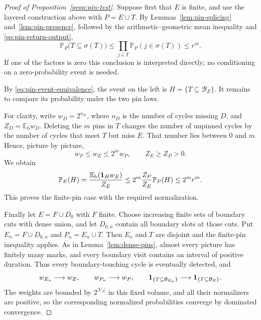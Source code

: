 \begin{proof}[Proof of Proposition~\ref{prop:pin-test}]
Suppose first that $E$ is finite, and use the layered construction
above with $P=E\cup T$.  By
Lemmas~\ref{lem:pin-splicing} and~\ref{lem:pin-presence}, followed
by the arithmetic--geometric mean inequality and
\eqref{eq:pin-return-output},
\begin{equation}\label{eq:pin-return-product}
 \mathbb P_P\bigl(T\subseteq\sigma(T)\bigr)
       \le\prod_{j\in T}\mathbb P_P(j\in\sigma(T))\le r^m.
\end{equation}
If one of the factors is zero this conclusion is interpreted directly;
no conditioning on a zero-probability event is needed.

By \eqref{eq:pin-event-equivalence}, the event on the left is
$H=\{T\subseteq\mathcal B_E\}$.  It remains to compare its probability
under the two pin laws.

For clarity, write $w_D=2^{n_D}$, where $n_D$ is the number of cycles
missing $D$, and $Z_D=\mathbb E_{\mathrm b}w_D$.
Deleting the $m$ pins in $T$ changes the number of unpinned cycles by
the number of cycles that meet $T$ but miss $E$.  That number lies
between $0$ and $m$.  Hence, picture by picture,
\[
                w_P\le w_E\le 2^m w_P,
                \qquad Z_E\ge Z_P>0.
\]
We obtain
\[
 \mathbb P_E(H)
  =\frac{\mathbb E_{\mathrm b}(\mathbf 1_Hw_E)}{Z_E}
  \le 2^m\frac{Z_P}{Z_E}\mathbb P_P(H)
  \le 2^m r^m.
\]
This proves the finite-pin case with the required normalization.

Finally let $E=F\cup D_0$ with $F$ finite.  Choose increasing finite
sets of boundary cuts with dense union, and let $D_{0,n}$ contain all
boundary slots at those cuts.  Put $E_n=F\cup D_{0,n}$ and
$P_n=E_n\cup T$.  Then $E_n$ and $T$ are disjoint and the finite-pin
inequality applies.  As in Lemma~\ref{lem:dense-pins}, almost every
picture has finitely many marks, and every boundary visit contains
an interval of positive duration.  Thus every boundary-touching
cycle is eventually detected, and
\[
       w_{E_n}\longrightarrow w_E,\qquad
       w_{P_n}\longrightarrow w_P,\qquad
       \mathbf 1_{\{T\subseteq\mathcal B_{E_n}\}}
              \longrightarrow\mathbf 1_{\{T\subseteq\mathcal B_E\}}.
\]
The weights are bounded by $2^{|V_\Lambda|}$ in this fixed volume,
and all their normalizers are positive, so the corresponding
normalized probabilities converge by dominated convergence.


\end{proof}
